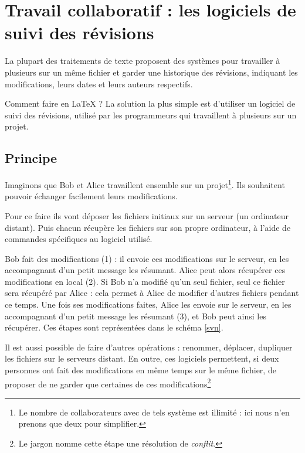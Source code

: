 \chapter{Travail collaboratif : les logiciels de suivi des révisions}\label{principesvn}    %

\begin{prealable}
    La plupart des traitements de texte proposent des systèmes pour travailler à plusieurs sur un même fichier et garder une historique des révisions, indiquant les modifications, leurs dates et leurs auteurs respectifs. 
    
    Comment faire en \LaTeX{} ? La solution la plus simple est d'utiliser un logiciel de suivi des révisions, utilisé par les programmeurs qui travaillent à plusieurs sur un projet.
\end{prealable}

\section{Principe}
Imaginons que Bob et Alice travaillent ensemble sur un projet\footnote{Le nombre de collaborateurs avec de tels système est illimité : ici nous n'en prenons que deux pour simplifier.}. Ils souhaitent pouvoir échanger facilement leurs modifications.

Pour ce faire ils vont déposer les fichiers initiaux sur un serveur (un ordinateur distant). Puis chacun récupère les fichiers sur son propre ordinateur, à l'aide de commandes spécifiques au logiciel utilisé.

Bob fait des modifications (1) : il envoie ces modifications sur le serveur, en les accompagnant d'un petit message les résumant. Alice peut alors récupérer ces modifications en local (2). Si Bob n'a modifié qu'un seul fichier, seul ce fichier sera récupéré par Alice : cela permet à Alice de modifier d'autres fichiers pendant ce temps. Une fois ses modifications faites, Alice les envoie sur le serveur, en les accompagnant d'un petit message les résumant (3), et Bob peut ainsi les récupérer. Ces étapes sont représentées dans le schéma \ref{svn}. 

Il est aussi possible de faire d'autres opérations : renommer, déplacer, dupliquer les fichiers sur le serveurs distant. En outre, ces logiciels permettent, si deux personnes ont fait des modifications en même temps sur le même fichier, de proposer de ne garder que certaines de ces modifications\footnote{Le jargon nomme cette étape une résolution de \emph{conflit}.}

